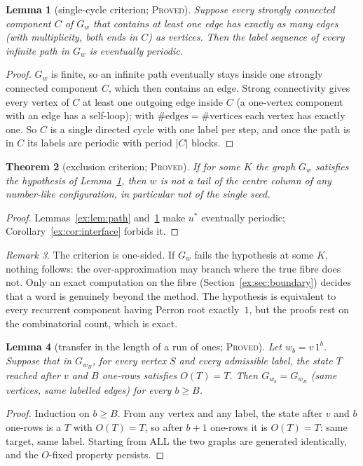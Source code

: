 \documentclass[11pt]{article}
\newtheorem{theorem}{Theorem}[section]
\newtheorem{lemma}[theorem]{Lemma}
\theoremstyle{definition}
\theoremstyle{remark}
\newtheorem{remark}[theorem]{Remark}
\newcommand{\ALL}{\mathrm{ALL}}
\newcommand{\PROVED}{\textsc{Proved}}
\begin{document}
\begin{lemma}[single-cycle criterion; \PROVED]\label{ex:lem:cycle}
Suppose every strongly connected component $C$ of $G_w$ that contains at least one edge has exactly as many edges (with multiplicity, both ends in $C$) as vertices. Then the label sequence of every infinite path in $G_w$ is eventually periodic.
\end{lemma}
\begin{proof}
$G_w$ is finite, so an infinite path eventually stays inside one strongly connected component $C$, which then contains an edge. Strong connectivity gives every vertex of $C$ at least one outgoing edge inside $C$ (a one-vertex component with an edge has a self-loop); with $\#\text{edges}=\#\text{vertices}$ each vertex has exactly one. So $C$ is a single directed cycle with one label per step, and once the path is in $C$ its labels are periodic with period $|C|$ blocks.
\end{proof}

\begin{theorem}[exclusion criterion; \PROVED]\label{ex:thm:A}
If for some $K$ the graph $G_w$ satisfies the hypothesis of Lemma~\ref{ex:lem:cycle}, then $w$ is not a tail of the centre column of any number-like configuration, in particular not of the single seed.
\end{theorem}
\begin{proof}
Lemmas~\ref{ex:lem:path} and~\ref{ex:lem:cycle} make $u^*$ eventually periodic; Corollary~\ref{ex:cor:interface} forbids it.
\end{proof}

\begin{remark}\label{ex:rem:onesided}
The criterion is one-sided. If $G_w$ fails the hypothesis at some $K$, nothing follows: the over-approximation may branch where the true fibre does not. Only an exact computation on the fibre (Section~\ref{ex:sec:boundary}) decides that a word is genuinely beyond the method. The hypothesis is equivalent to every recurrent component having Perron root exactly~$1$, but the proofs rest on the combinatorial count, which is exact.
\end{remark}

\begin{lemma}[transfer in the length of a run of ones; \PROVED]\label{ex:lem:transfer}
Let $w_b=v\,1^b$. Suppose that in $G_{w_B}$, for every vertex $S$ and every admissible label, the state $T$ reached after $v$ and $B$ one-rows satisfies $O(T)=T$. Then $G_{w_b}=G_{w_B}$ (same vertices, same labelled edges) for every $b\ge B$.
\end{lemma}
\begin{proof}
Induction on $b\ge B$. From any vertex and any label, the state after $v$ and $b$ one-rows is a $T$ with $O(T)=T$, so after $b+1$ one-rows it is $O(T)=T$: same target, same label. Starting from $\ALL$ the two graphs are generated identically, and the $O$-fixed property persists.
\end{proof}
\end{document}
